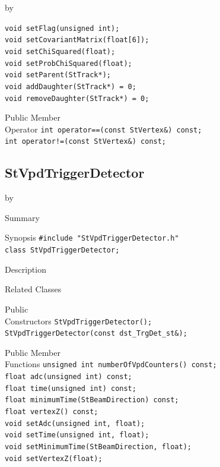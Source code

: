 \documentclass[twoside]{article}
\newcommand{\entrylabel}[1]{\mbox{\textbf{{#1}}}\hfil}%
\newenvironment{entry}
{\begin{list}{}%
    {\renewcommand{\makelabel}{\entrylabel}%
     \setlength{\labelwidth}{90pt}%
     \setlength{\leftmargin}{\labelwidth}
     \advance\leftmargin by \labelsep%
      }%
    }%
  {\end{list}}
\newcommand{\Entrylabel}[1]%
{\raisebox{0pt}[1ex][0pt]{\makebox[\labelwidth][l]%
    {\parbox[t]{\labelwidth}{\hspace{0pt}\textbf{{#1}}}}}}
\newenvironment{Entry}%
{\renewcommand{\entrylabel}{\Entrylabel}\begin{entry}}%
  {\end{entry}}
\begin{document}
\begin{Entry}
    \verb+void setFlag(unsigned int);+\\
    \verb+void setCovariantMatrix(float[6]);+\\
    \verb+void setChiSquared(float);+\\
    \verb+void setProbChiSquared(float);+\\
    \verb+void setParent(StTrack*);+\\
    \verb+void addDaughter(StTrack*) = 0;+\\
    \verb+void removeDaughter(StTrack*) = 0;+\\

\item[Public Member\\ Operator]
    \verb+int operator==(const StVertex&) const;+\\
    \verb+int operator!=(const StVertex&) const;+\\
\end{Entry}
\clearpage


\subsection{StVpdTriggerDetector}
\label{sec:StVpdTriggerDetector}
\begin{Entry}
\item[Summary]
\item[Synopsis]
    \verb+#include "StVpdTriggerDetector.h"+\\
    \verb+class StVpdTriggerDetector;+\\
\item[Description]
\item[Related Classes]
\item[Public\\ Constructors]
    \verb+StVpdTriggerDetector();+\\
    \verb+StVpdTriggerDetector(const dst_TrgDet_st&);+\\
\item[Public Member\\ Functions]
    \verb+unsigned int numberOfVpdCounters() const;+\\
    \verb+float adc(unsigned int) const;+\\
    \verb+float time(unsigned int) const;+\\
    \verb+float minimumTime(StBeamDirection) const;+\\
    \verb+float vertexZ() const;+\\
    \verb+void setAdc(unsigned int, float);+\\
    \verb+void setTime(unsigned int, float);+\\
    \verb+void setMinimumTime(StBeamDirection, float);+\\
    \verb+void setVertexZ(float);+\\
\end{Entry}
\clearpage
\end{document}
